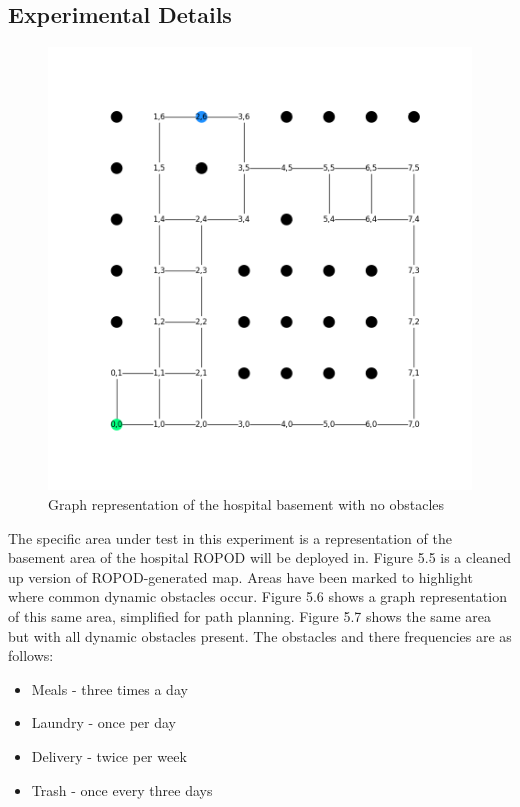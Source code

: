   \clearpage


  \subsection{ Experimental Details }

  \begin{figure}[!htb]
    \centering
    \includegraphics[width=\linewidth]{images/results/Empty_Hospital.png}
    \caption{Graph representation of the hospital basement with no obstacles}
    \label{figure:basement_congestion_empty}
  \end{figure}

  The specific area under test in this experiment is a representation
  of the basement area of the hospital ROPOD will be deployed in. Figure 5.5
  is a cleaned up version of ROPOD-generated map. Areas have been marked
  to highlight where common dynamic obstacles occur. Figure 5.6 shows a graph
  representation of this same area, simplified for path planning. Figure 5.7
  shows the same area but with all dynamic obstacles present. The obstacles
  and there frequencies are as follows: \\

  \begin{itemize}

    \item Meals - three times a day

    \item Laundry - once per day

    \item Delivery - twice per week

    \item Trash - once every three days

  \end{itemize}

